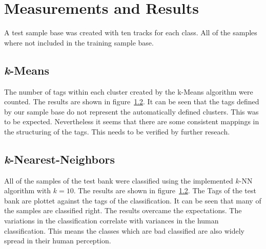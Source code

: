 \section{Measurements and Results}
\label{sec:Measurements}
A test sample base was created with ten tracks for each class. All of the samples where not included in the training sample base. 

\subsection{\textit{k}-Means}
The number of tags within each cluster created by the k-Means algorithm were counted. The results are shown in figure~\ref{}. It can be seen that the tags defined by our sample base do not represent the automatically defined clusters. This was to be expected. Nevertheless it seems that there are some consistent mappings in the structuring of the tags. This needs to be verified by further reseach. 


\subsection{\textit{k}-Nearest-Neighbors}
All of the samples of the test bank were classified using the implemented $k$-NN algorithm with $k=10$. The results are shown in figure~\ref{}. The Tags of the test bank are plottet against the tags of the classification. It can be seen that many of the samples are classified right. The results overcame the expectations. The variations in the classification correlate with variances in the human classification. This means the classes which are bad classified are also widely spread in their human perception. 